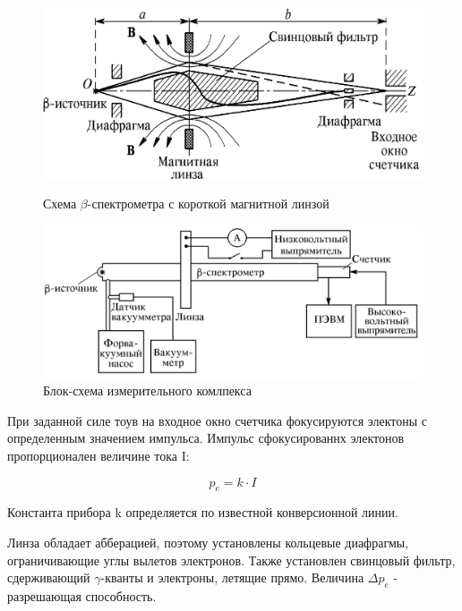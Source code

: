 \documentclass[a4paper]{article}
\begin{document}
\begin{figure}[h]
	\begin{center}
	\begin{minipage}[h]{0.45\linewidth}
	\includegraphics[width=1\linewidth]{p2.png}
	\caption{Схема $\beta$-спектрометра с короткой магнитной линзой} 
    \label{p2}
	\end{minipage}
	\hfill 
	\begin{minipage}[h]{0.45\linewidth}
	\includegraphics[width=1\linewidth]{p3.png}
	\caption{Блок-схема измерительного комлпекса}
	\label{p3}
	\end{minipage}
	\end{center}
\end{figure}

При заданной силе тоув на входное окно счетчика фокусируются электоны с 
определенным значением импульса. Импульс сфокусированнх электонов пропорционален 
величине тока I:

\begin{equation}
    p_e = k\cdot I
    \label{eq7}
\end{equation}

Константа прибора k определяется по известной конверсионной линии.

Линза обладает абберацией, поэтому установлены кольцевые диафрагмы, ограничивающие
углы вылетов электронов. Также установлен свинцовый фильтр, сдерживающий $\gamma$-кванты 
и электроны, летящие прямо. Величина $\Delta p_e$ - разрешающая способность.
\end{document}
